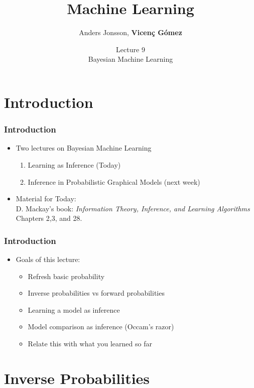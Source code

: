 \documentclass{beamer}
\title{Machine Learning}
\author{Anders Jonsson, \textbf{Vicenç Gómez}}
\institute{Master in Intelligent Interactive Systems\\
2021-22}
\date{Lecture 9\\Bayesian Machine Learning}
\begin{document}
\maketitle

\section{Introduction}

\begin{frame}
  \frametitle{Introduction}
  \begin{itemize}
    \item Two lectures on Bayesian Machine Learning
    \begin{enumerate}
        \item Learning as Inference (Today)
        \item Inference in Probabilistic Graphical Models (next week)
    \end{enumerate}
    \item Material for Today: \\
    D. Mackay's book: \emph{Information Theory, Inference, and Learning Algorithms}\\
    Chapters 2,3, and 28.
  \end{itemize}
\end{frame}

\begin{frame}
  \frametitle{Introduction}
  \begin{itemize}
    \item Goals of this lecture:
    \begin{itemize}
        \item Refresh basic probability
        \item Inverse probabilities vs forward probabilities
        \item Learning a model as inference
        \item Model comparison as inference (Occam's razor)
        \item Relate this with what you learned so far
    \end{itemize}
  \end{itemize}
\end{frame}


\section{Inverse Probabilities}
\end{document}
